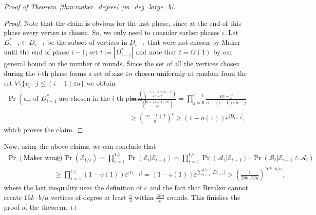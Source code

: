 \documentclass[11pt, a4paper]{article}
\numberwithin{equation}{section}
\numberwithin{figure}{section}
\newcommand{\Prob}{\operatorname{Pr}}
\begin{document}
\begin{proof}[Proof of Theorem~\ref{thm:maker_degree}~\ref{m_deg_large_b}]
\begin{proof}
Note that the claim is obvious for the last phase,
since at the end of this phase every vertex is chosen.
So, we only need to consider earlier phases $i$.
Let $D_{i-1}^\ast \subset D_{i-1}$ 
be the subset of vertices in
$D_{i-1}$ that were not chosen by Maker until the end of phase $i-1$; set $t:=|D_{i-1}^\ast|$
and note that $t=O(1)$ by our general bound on the number of rounds.
Since the set of all
the vertices chosen during the $i$-th phase
forms a set of size $\varepsilon n $ 
chosen uniformly at random
from the set $V\setminus \{v_j:~ j\leq (i-1) \varepsilon n\}$ we obtain
\begin{align*}
\Prob(\text{all of $D_{i-1}^\ast$ are chosen in the $i$-th phase})
& =
\frac{\binom{n-(i-1)\varepsilon n-t}{\varepsilon n-t}}{\binom{n-(i-1)\varepsilon n}{\varepsilon n}}
=
\prod_{j=0}^{t-1}
\frac{\varepsilon n - j}{n-(i-1)\varepsilon n - j} \\
& \geq
\left( \frac{\varepsilon n-t+1}{n} \right)^t
\geq 
(1-o(1))\varepsilon^{|D_{i-1}|} ,
\end{align*}
which proves the claim.
\end{proof}

Now, using the above claims, we can conclude that
\begin{align*}
\Prob(\text{Maker wins})
& \geq
\Prob\left(  \mathcal{E}_{1/\varepsilon} \right)
=
\prod_{i=1}^{1/\varepsilon} 
\Prob\left( \mathcal{E}_i | \mathcal{E}_{i-1} \right)
=
\prod_{i=1}^{1/\varepsilon}
\Prob\left( \mathcal{A}_i | \mathcal{E}_{i-1} \right)\cdot
\Prob\left( \mathcal{B}_i | \mathcal{E}_{i-1} \land \mathcal{A}_i \right) \\
& \geq
\prod_{i=1}^{1/\varepsilon}
(1-o(1))\varepsilon^{|D_{i-1}|}
=
(1-o(1))\varepsilon^{\sum_{i=1}^{1/\varepsilon} |D_{i-1}|}
> 
\left( \frac{1}{20k\cdot b/a} \right)^{16k\cdot b/a},
\end{align*}
where
the last inequality uses the definition of $\varepsilon$
and the fact that Breaker cannot create 
$16k\cdot b/a$ vertices of degree at least $\frac{n}{4}$
within $\frac{2kn}{a}$ rounds.
This finishes the proof of the theorem.
\end{proof}








\bigskip

\end{document}

